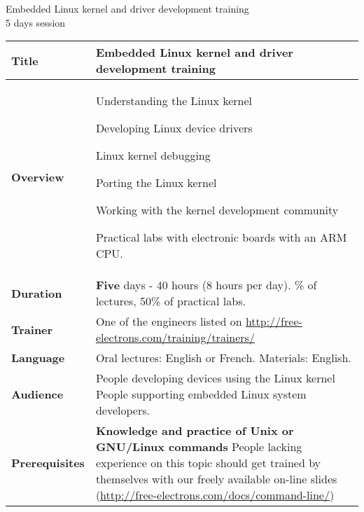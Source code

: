 \documentclass[a4paper,12pt,obeyspaces,spaces,hyphens]{article}
\begin{document}
\thispagestyle{fancy}

\setlength{\arrayrulewidth}{0.8pt}

\begin{center}
\LARGE
Embedded Linux kernel and driver development training\\
\large
5 days session
\end{center}
\vspace{1cm}

\small
{}

 {
  \begin{tabularx}{\textwidth}{|g|h|}
    {\bf Title} & Embedded Linux kernel and driver development
    training \\
    \hline

    {\bf Overview} &
    Understanding the Linux kernel \par
    Developing Linux device drivers \par
    Linux kernel debugging \par
    Porting the Linux kernel \par
    Working with the kernel development community \par
    Practical labs with electronic boards with an ARM CPU.\\
    \hline

    {\bf Duration} & {\bf Five} days - 40 hours (8 hours per day).
    \% of lectures, 50\% of practical labs. \\
    \hline

    {\bf Trainer} & One of the engineers listed on
    \newline \url{http://free-electrons.com/training/trainers/}\\
    \hline

    {\bf Language} & Oral lectures: English or French.
    \newline Materials: English.\\
    \hline

    {\bf Audience} & People developing devices using the Linux kernel
    \newline People supporting embedded Linux system developers. \\
    \hline

    {\bf Prerequisites} & {\bf Knowledge and practice of Unix or
      GNU/Linux commands}
    \newline People lacking experience on this topic should get
    trained by themselves with our freely available on-line slides
    (\url{http://free-electrons.com/docs/command-line/})
     \\
    \hline


\end{tabularx}}
\end{document}
